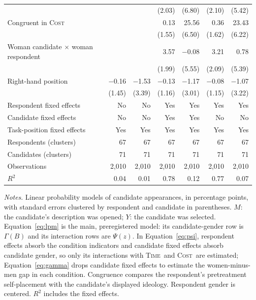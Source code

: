 \documentclass[11pt]{article}\usepackage[]{graphicx}\usepackage[]{xcolor}
\newcommand{\armT}{\textsc{Time}}
\newcommand{\armC}{\textsc{Cost}}
\newenvironment{notes}{\par\smallskip\begin{minipage}{\linewidth}\footnotesize\textit{Notes.}}{\end{minipage}}
\begin{document}
\begin{table}[!htbp]
\begin{tabular}{@{}lrrrrrr@{}}
 &  &  & (2.03) & (6.80) & (2.10) & (5.42) \\
Congruent in \armC &  &  & 0.13 & 25.56 & 0.36 & 23.43 \\
 &  &  & (1.55) & (6.50) & (1.62) & (6.22) \\
Woman candidate $\times$ woman respondent &  &  & 3.57 & $-$0.08 & 3.21 & 0.78 \\
 &  &  & (1.99) & (5.55) & (2.09) & (5.39) \\
Right-hand position & $-$0.16 & $-$1.53 & $-$0.13 & $-$1.17 & $-$0.08 & $-$1.07 \\
 & (1.45) & (3.39) & (1.16) & (3.01) & (1.15) & (3.22) \\
\midrule
Respondent fixed effects & No & No & Yes & Yes & Yes & Yes \\
Candidate fixed effects & No & No & Yes & Yes & No & No \\
Task-position fixed effects & Yes & Yes & Yes & Yes & Yes & Yes \\
Respondents (clusters) & 67 & 67 & 67 & 67 & 67 & 67 \\
Candidates (clusters) & 71 & 71 & 71 & 71 & 71 & 71 \\
Observations & 2,010 & 2,010 & 2,010 & 2,010 & 2,010 & 2,010 \\
$R^2$ & 0.04 & 0.01 & 0.78 & 0.12 & 0.77 & 0.07 \\
\bottomrule
\end{tabular}

\begin{notes}
Linear probability models of candidate appearances, in percentage points, with standard errors clustered by respondent and candidate in parentheses. $M$: the candidate's description was opened; $Y$: the candidate was selected. Equation~\eqref{eq:lpm} is the main, preregistered model: its candidate-gender row is $\Gamma(B)$ and its interaction rows are $\Psi(z)$. In Equation~\eqref{eq:psi}, respondent effects absorb the condition indicators and candidate fixed effects absorb candidate gender, so only its interactions with \armT\ and \armC\ are estimated; Equation~\eqref{eq:gamma} drops candidate fixed effects to estimate the women-minus-men gap in each condition. Congruence compares the respondent's pretreatment self-placement with the candidate's displayed ideology. Respondent gender is centered. $R^2$ includes the fixed effects.
\end{notes}
\end{table}
\end{document}
